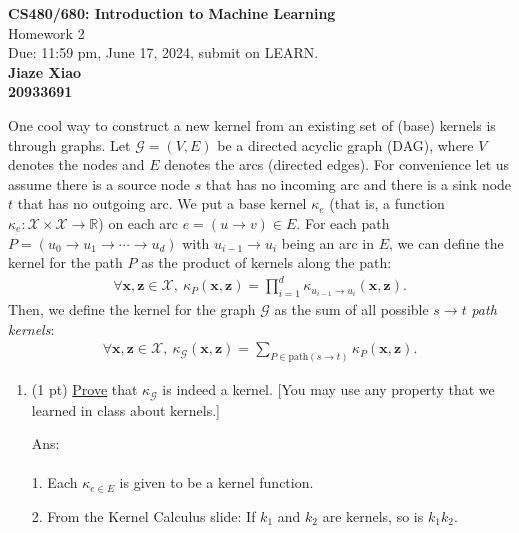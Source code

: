\documentclass[10pt]{article}
\newcommand{\xv}{\mathbf{x}}
\newcommand{\zv}{\mathbf{z}}
\newcommand{\ans}[1]{{\color{blue}\textsf{Ans}: #1}}
\newcommand{\red}[1]{{\color{red}#1}}
\newcommand{\green}[1]{{\color{green}#1}}
\begin{document}
\begin{center}
	\large{\textbf{CS480/680: Introduction to Machine Learning} \\ Homework 2\\ \red{Due: 11:59 pm, June 17, 2024}, \red{submit on LEARN}.} \\

	{\bf \green{Jiaze Xiao}} \\
	{\bf \green{20933691}}

\end{center}

\begin{exercise}
	One cool way to construct a new kernel from an existing set of (base) kernels is through graphs. Let $\mathcal{G} = (V, E)$ be a directed acyclic graph (DAG), where $V$ denotes the nodes and $E$ denotes the arcs (directed edges). For convenience let us assume there is a source node $s$ that has no incoming arc and there is a sink node $t$ that has no outgoing arc. We put a base kernel $\kappa_e$ (that is, a function $\kappa_e: \mathcal{X} \times \mathcal{X} \to \mathds{R}$) on each arc $e = (u \to v) \in E$. For each path $P = (u_0 \to u_1 \to \cdots \to u_d)$ with $u_{i-1} \to u_i$ being an arc in $E$, we can define the kernel for the path $P$ as the product of kernels along the path:
	\begin{align}
		\forall \xv, \zv \in \mathcal{X},~
		\kappa_P(\xv, \zv) = \prod_{i=1}^d \kappa_{u_{i-1}\to u_i} (\xv, \zv).
	\end{align}
	Then, we define the kernel for the graph $\mathcal{G}$ as the sum of all possible $s\to t$ \emph{path kernels}:
	\begin{align}
		\forall \xv, \zv \in \mathcal{X},~
		\kappa_{\mathcal{G}}(\xv, \zv) = \sum_{P \in \mathrm{path}(s \to t)} \kappa_P(\xv, \zv).
	\end{align}

	\begin{enumerate}
		\item (1 pt) \uline{Prove} that $\kappa_{\mathcal{G}}$ is indeed a kernel. [You may use any property that we learned in class about kernels.]

		      \ans\\
		      \leavevmode\\
		      1. Each $\kappa_{e\in E}$ is given to be a kernel function.

		      2. From the Kernel Calculus slide: If $k_1$ and $k_2$ are kernels, so is $k_1 k_2$.


\end{enumerate}
\end{exercise}
\end{document}
